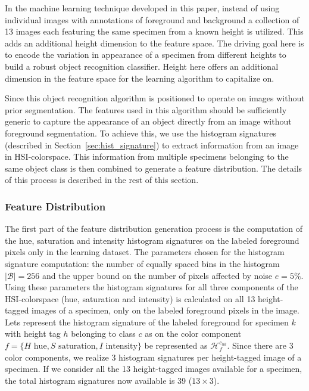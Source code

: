 \documentclass {udthesis}
\begin{document}
In the machine learning technique developed in this paper, instead of using individual images with annotations of foreground and background a collection of 13 images each featuring the same specimen from a known height is utilized. This adds an additional height dimension to the feature space. The driving goal here is to encode the variation in appearance of a specimen from different heights to build a robust object recognition classifier. Height here offers an additional dimension in the feature space for the learning algorithm to capitalize on.

Since this object recognition algorithm is positioned to operate on images without prior segmentation. The features used in this algorithm should be sufficiently generic to capture the appearance of an object directly from an image without foreground segmentation. To achieve this, we use the histogram signatures (described in Section~\ref{sec:hist_signature}) to extract information from an image in HSI-colorspace. This information from multiple specimens belonging to the same object class is then combined to generate a feature distribution. The details of this process is described in the rest of this section.

\subsubsection{Feature Distribution}

The first part of the feature distribution generation process is the computation of the hue, saturation and intensity histogram signatures on the labeled foreground pixels only in the learning dataset. The parameters chosen for the histogram signature computation: the number of equally spaced bins in the histogram $|\mathcal{B}|=256$ and the upper bound on the number of pixels affected by noise $e=5\%$. Using these parameters the histogram signatures for all three components of the HSI-colorspace (hue, saturation and intensity) is calculated on all 13 height-tagged images of a specimen, only on the labeled foreground pixels in the image. Lets represent the histogram signature of the labeled foreground for specimen $k$ with height tag $h$ belonging to class $c$ as on the color component $f=\{H \text{ hue}, S \text{ saturation}, I \text{ intensity}\}$ be represented as $\mathcal{H}^{c_{hk}}_f$. Since there are 3 color components, we realize 3 histogram signatures per height-tagged image of a specimen. If we consider all the 13 height-tagged images available for a specimen, the total histogram signatures now available is 39 ($13 \times 3$).
\end{document}
